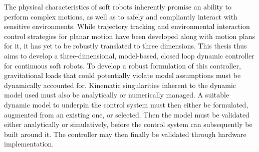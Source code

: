 
The physical characteristics of soft robots inherently promise an ability to perform complex motions, as well as to safely and compliantly interact with sensitive environments. 
While trajectory tracking and environmental interaction control strategies for planar motion have been developed along with motion plans for it, it has yet to be robustly translated to three dimensions. 
This thesis thus aims to develop a three-dimensional, model-based, closed loop dynamic controller for continuous soft robots.
To develop a robust formulation of this controller, gravitational loads that could potentially violate model assumptions must be dynamically accounted for. Kinematic singularities inherent to the dynamic model used must also be analytically or numerically managed.
A suitable dynamic model to underpin the control system must then either be formulated, augmented from an existing one, or selected. Then the model must be validated either analytically or simulatively, before the control system can subsequently be built around it. The controller may then finally be validated through hardware implementation.
